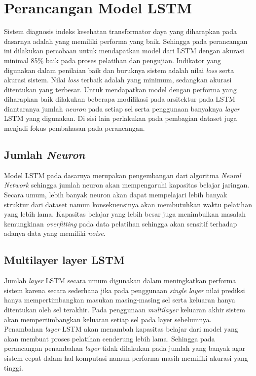 \section{Perancangan Model LSTM}

Sistem diagnosis indeks kesehatan transformator daya yang diharapkan pada dasarnya adalah yang memiliki performa yang baik. Sehingga pada perancangan ini dilakukan percobaan untuk mendapatkan model dari LSTM dengan akurasi minimal 85\% baik pada proses pelatihan dan pengujian. Indikator yang digunakan dalam penilaian baik dan buruknya sistem adalah nilai \textit{loss} serta akurasi sistem. Nilai \textit{loss} terbaik adalah yang minimum, sedangkan akurasi ditentukan yang terbesar. Untuk mendapatkan model dengan performa yang diharapkan baik dilakukan beberapa modifikasi pada arsitektur pada LSTM diantaranya jumlah \textit{neuron} pada setiap sel serta penggunaan banyaknya \textit{layer} LSTM yang digunakan. Di sisi lain perlakukan pada pembagian dataset juga menjadi fokus pembahasan pada perancangan.

\subsection{Jumlah \textit{Neuron}}
Model LSTM pada dasarnya merupakan pengembangan dari algoritma \textit{Neural Network} sehingga jumlah neuron akan mempengaruhi kapasitas belajar jaringan. Secara umum, lebih banyak neuron akan dapat mempelajari lebih banyak struktur dari dataset namun konsekuensinya akan membutuhkan waktu pelatihan yang lebih lama. Kapasitas belajar yang lebih besar juga menimbulkan masalah kemungkinan \textit{overfitting} pada data pelatihan sehingga akan sensitif terhadap adanya data yang memiliki \textit{noise}.

\subsection{Multilayer layer LSTM}
Jumlah \textit{layer} LSTM secara umum digunakan dalam meningkatkan performa sistem karena secara sederhana jika pada penggunaan \textit{single layer} nilai prediksi hanya mempertimbangkan masukan masing-masing sel serta keluaran hanya ditentukan oleh sel terakhir. Pada penggunaan \textit{multilayer} keluaran akhir sistem akan mempertimbangkan keluaran setiap sel pada layer sebelumnya. Penambahan \textit{layer} LSTM akan menambah kapasitas belajar dari model yang akan membuat proses pelatihan cenderung lebih lama. Sehingga pada perancangan penambahan \textit{layer} tidak dilakukan pada jumlah yang banyak agar sistem cepat dalam hal komputasi namun performa masih memiliki akurasi yang tinggi. 

